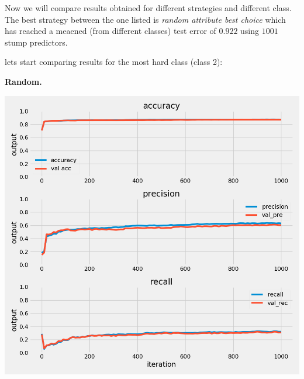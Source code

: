 \documentclass{article}
\begin{document}
Now we will compare results obtained for different strategies and different class.
The best strategy between the one listed is \textit{random attribute best choice} which has 
reached a meaened (from different classes) test error of $0.922$ using $1001$ stump predictors.

\newpage
lets start comparing results for the most hard class (class 2):
\begin{multicols}{2}

	\begin{minipage}[t]{1\columnwidth}
	\begin{center}
	\textbf{Random.}\par\medskip
	\includegraphics[width=0.9\columnwidth]{../images/random_choice_class_2_cross_val_4.png}
	\label{random}
	\end{center}
	\end{minipage}


\end{multicols}
\end{document}
